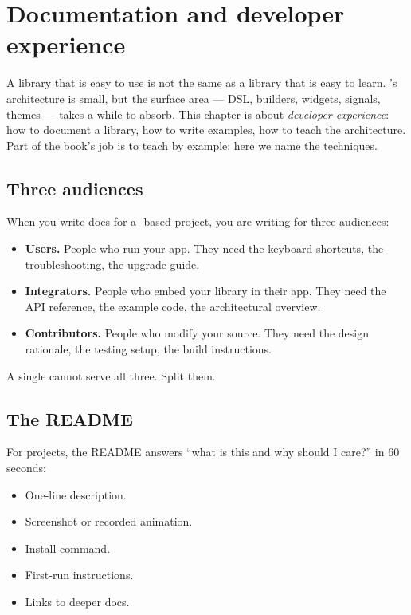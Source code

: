 \chapter{Documentation and developer experience}
\label{ch:devx}

\begin{aside}
A library that is easy to use is not the same as a library that
is easy to learn. \maya{}'s architecture is small, but the
surface area --- DSL, builders, widgets, signals, themes ---
takes a while to absorb. This chapter is about \emph{developer
experience}: how to document a \maya{} library, how to write
examples, how to teach the architecture. Part of the book's job
is to teach by example; here we name the techniques.
\end{aside}

\section{Three audiences}

When you write docs for a \maya{}-based project, you are writing
for three audiences:

\begin{itemize}[leftmargin=*]
  \item \textbf{Users.} People who run your app. They need
    the keyboard shortcuts, the troubleshooting, the upgrade
    guide.
  \item \textbf{Integrators.} People who embed your library
    in their app. They need the API reference, the example
    code, the architectural overview.
  \item \textbf{Contributors.} People who modify your source.
    They need the design rationale, the testing setup, the
    build instructions.
\end{itemize}

A single  cannot serve all three. Split them.

\section{The README}

For \maya{} projects, the README answers ``what is this and
why should I care?'' in 60 seconds:

\begin{itemize}[leftmargin=*]
  \item One-line description.
  \item Screenshot or recorded animation.
  \item Install command.
  \item First-run instructions.
  \item Links to deeper docs.
\end{itemize}

